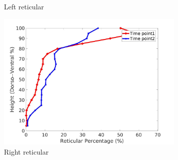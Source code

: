 \begin{figure}[H]
\begin{subfigure}{.42\linewidth}
  \caption{Left reticular}
  \label{fig:IPF10DiseaseDorsoToVentral-c} 
\end{subfigure} 
\begin{subfigure}{.42\linewidth}%
  \includegraphics[width=\linewidth,trim={{.0\wd0} {.0\wd0} {.0\wd0} {.0\wd0}},clip]{Appendix/Image_AppexA/DorsoToVentral/IPF10RightLungReticularDiseaseDorsoToVentral.jpg}
  \caption{Right reticular}
  \label{fig:IPF10DiseaseDorsoToVentral-d}
\end{subfigure}
\begin{subfigure}{.42\linewidth}%

\end{subfigure}
\end{figure}
